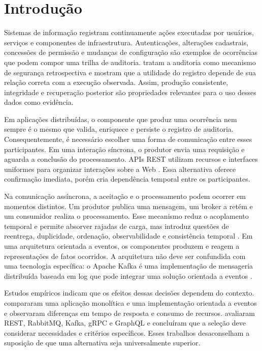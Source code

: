 \chapter{Introdução}
\label{cap:introducao}

Sistemas de informação registram continuamente ações executadas por usuários, serviços e componentes de infraestrutura. Autenticações, alterações cadastrais, concessões de permissão e mudanças de configuração são exemplos de ocorrências que podem compor uma trilha de auditoria.  tratam a auditoria como mecanismo de segurança retrospectiva e mostram que a utilidade do registro depende de sua relação correta com a execução observada. Assim, produção consistente, integridade e recuperação posterior são propriedades relevantes para o uso desses dados como evidência.

Em aplicações distribuídas, o componente que produz uma ocorrência nem sempre é o mesmo que valida, enriquece e persiste o registro de auditoria. Consequentemente, é necessário escolher uma forma de comunicação entre esses participantes. Em uma interação síncrona, o produtor envia uma requisição e aguarda a conclusão do processamento. APIs REST utilizam recursos e interfaces uniformes para organizar interações sobre a Web \cite{fielding2002,pautasso2008}. Essa alternativa oferece confirmação imediata, porém cria dependência temporal entre os participantes.

Na comunicação assíncrona, a aceitação e o processamento podem ocorrer em momentos distintos. Um produtor publica uma mensagem, um broker a retém e um consumidor realiza o processamento. Esse mecanismo reduz o acoplamento temporal e permite absorver rajadas de carga, mas introduz questões de reentrega, duplicidade, ordenação, observabilidade e consistência temporal \cite{aksakalli2021,helland2007}. Em uma arquitetura orientada a eventos, os componentes produzem e reagem a representações de fatos ocorridos. A arquitetura não deve ser confundida com uma tecnologia específica: o Apache Kafka é uma implementação de mensageria distribuída baseada em log que pode integrar uma solução orientada a eventos \cite{kreps2011}.

Estudos empíricos indicam que os efeitos dessas decisões dependem do contexto.  compararam uma aplicação monolítica e uma implementação orientada a eventos e observaram diferenças em tempo de resposta e consumo de recursos.  avaliaram REST, RabbitMQ, Kafka, gRPC e GraphQL e concluíram que a seleção deve considerar necessidades e critérios específicos. Esses trabalhos desaconselham a suposição de que uma alternativa seja universalmente superior.

